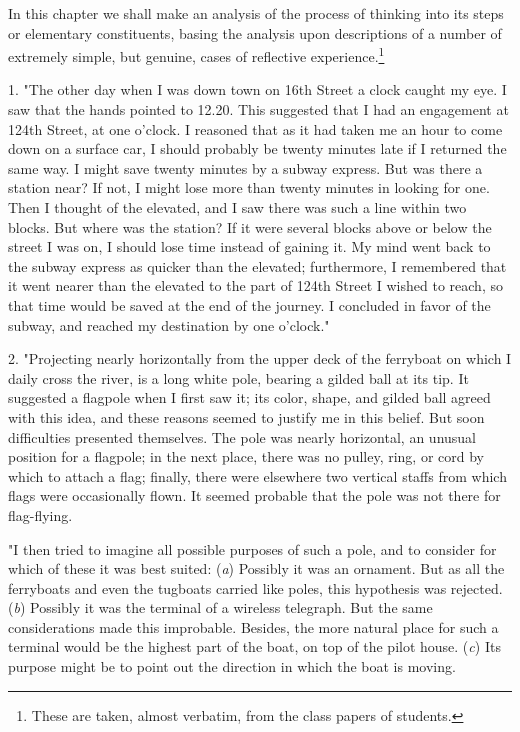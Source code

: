 \documentclass[letterpaper]{book}
\begin{document}
In this chapter we shall make an analysis of the process of thinking
into its steps or elementary constituents, basing the analysis upon
descriptions of a number of extremely simple, but genuine, cases of
reflective
experience.\footnote{
These are taken, almost verbatim, from the class papers of students.
}


1. "The other day when I was down town on 16th Street a clock caught my
eye. I saw that the hands pointed to 12.20. This suggested that I had an
engagement at 124th Street, at one o'clock. I reasoned
that
as it had taken me an hour to come down on a surface car, I should
probably be twenty minutes late if I returned the same way. I might save
twenty minutes by a subway express. But was there a station near? If
not, I might lose more than twenty minutes in looking for one. Then I
thought of the elevated, and I saw there was such a line within two
blocks. But where was the station? If it were several blocks above or
below the street I was on, I should lose time instead of gaining it. My
mind went back to the subway express as quicker than the elevated;
furthermore, I remembered that it went nearer than the elevated to the
part of 124th Street I wished to reach, so that time would be saved at
the end of the journey. I concluded in favor of the subway, and reached
my destination by one o'clock."


2. "Projecting nearly horizontally from the upper deck of the ferryboat
on which I daily cross the river, is a long white pole, bearing a gilded
ball at its tip. It suggested a flagpole when I first saw it; its color,
shape, and gilded ball agreed with this idea, and these reasons seemed
to justify me in this belief. But soon difficulties presented
themselves. The pole was nearly horizontal, an unusual position for a
flagpole; in the next place, there was no pulley, ring, or cord by which
to attach a flag; finally, there were elsewhere two vertical staffs from
which flags were occasionally flown. It seemed probable that the pole
was not there for flag-flying.

"I then tried to imagine all possible purposes of such a pole, and to
consider for which of these it was best suited: (\emph{a}) Possibly it
was an ornament. But as all the ferryboats and even the tugboats carried
like
poles,
this hypothesis was rejected. (\emph{b}) Possibly it was the terminal of
a wireless telegraph. But the same considerations made this improbable.
Besides, the more natural place for such a terminal would be the highest
part of the boat, on top of the pilot house. (\emph{c}) Its purpose
might be to point out the direction in which the boat is moving.
\end{document}
